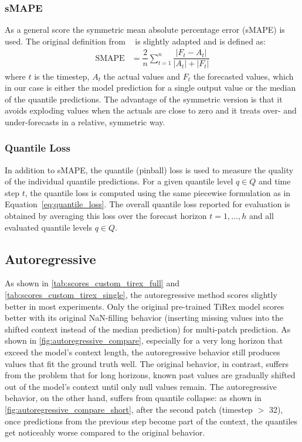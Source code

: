 \documentclass[a4paper,oneside,10pt,ngerman,english]{scrartcl}
\begin{document}
\subsubsection{sMAPE}
\label{sec:smape}
As a general score the symmetric mean absolute percentage error (sMAPE) is used. The original definition from \citeauthor{armstrong1985long}~\cite{armstrong1985long} is slightly adapted and is defined as:
\begin{align}
	\text{SMAPE} &= \dfrac{2}{n} \sum_{t=1}^{n} \dfrac{|F_t - A_t|}{|A_t| + |F_t|}
	\label{eq:smape}
\end{align}
where $t$ is the timestep, $A_t$ the actual values and $F_t$ the forecasted values, which in our case is either the model prediction for a single output value or the median of the quantile predictions. The advantage of the symmetric version is that it avoids exploding values when the actuals are close to zero and it treats over- and under-forecasts in a relative, symmetric way.

\subsubsection{Quantile Loss}
\label{sec:quantile_loss}
In addition to sMAPE, the quantile (pinball) loss is used to measure the quality of the individual quantile predictions. For a given quantile level $q \in Q$ and time step $t$, the quantile loss is computed using the same piecewise formulation as in Equation~\ref{eq:quantile_loss}. The overall quantile loss reported for evaluation is obtained by averaging this loss over the forecast horizon $t = 1,\ldots,h$ and all evaluated quantile levels $q \in Q$.


\subsection{Autoregressive}
\label{sec:autoregressive_results}

As shown in \autoref{tab:scores_custom_tirex_full} and \autoref{tab:scores_custom_tirex_single}, the autoregressive method scores slightly better in most experiments. Only the original pre-trained TiRex model scores better with its original NaN-filling behavior (inserting missing values into the shifted context instead of the median prediction) for multi-patch prediction. As shown in \autoref{fig:autoregressive_compare}, especially for a very long horizon that exceed the model's context length, the autoregressive behavior still produces values that fit the ground truth well. The original behavior, in contrast, suffers from the problem that for long horizons, known past values are gradually shifted out of the model's context until only null values remain. The autoregressive behavior, on the other hand, suffers from quantile collapse: as shown in \autoref{fig:autoregressive_compare_short}, after the second patch (timestep $>$ 32), once predictions from the previous step become part of the context, the quantiles get noticeably worse compared to the original behavior.
\end{document}
